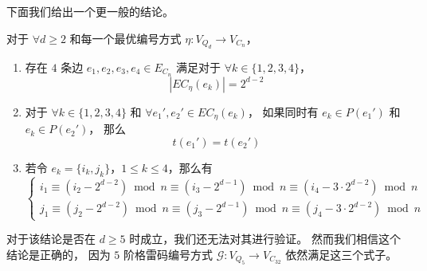 下面我们给出一个更一般的结论。
\begin{conjecture}
\label{Conjecture 5.1}
对于 $\forall d \ge 2$ 和每一个最优编号方式 $\eta \colon V_{Q_d} \rightarrow V_{C_n}$，
\begin{enumerate}[(1)]
	\item 存在 $4$ 条边 $e_1, e_2, e_3, e_4 \in E_{C_n}$ 满足对于 $\forall k \in \{1, 2, 3, 4\}$，
		\begin{equation}
		\label{Equation 5-4}
		|EC_\eta(e_k)| = 2^{d - 2}
		\end{equation}
	\item 对于 $\forall k \in \{1, 2, 3, 4\}$
		和 $\forall e_1', e_2' \in EC_\eta(e_k)$，
		如果同时有 $e_k \in P(e_1')$ 和 $e_k \in P(e_2')$，
		那么
		\begin{equation}
		\label{Equation 5-5}
		t(e_1') = t(e_2')
		\end{equation}
	\item 若令 $e_k = \{i_k, j_k\}$，$1 \le k \le 4$，那么有
		\begin{equation}
		\label{Equation 5-6}
		\begin{cases}
		i_1 \equiv (i_2 - 2^{d - 2}) \bmod n \equiv (i_3 - 2^{d - 1}) \bmod n \equiv (i_4 - 3 \cdot 2^{d - 2}) \bmod n \\
		j_1 \equiv (j_2 - 2^{d - 2}) \bmod n \equiv (j_3 - 2^{d - 1}) \bmod n \equiv (j_4 - 3 \cdot 2^{d - 2}) \bmod n
		\end{cases}
		\end{equation}
\end{enumerate}
\end{conjecture}

对于该结论是否在 $d \ge 5$ 时成立，我们还无法对其进行验证。
然而我们相信这个结论是正确的，
因为 $5$ 阶格雷码编号方式 $\mathcal{G} \colon V_{Q_5} \rightarrow V_{C_{32}}$
依然满足这三个式子。
